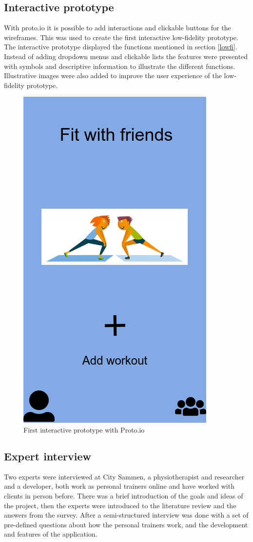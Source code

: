 \subsection{Interactive prototype}
With proto.io it is possible to add interactions and clickable buttons for the wireframes. This was used to create the first interactive low-fidelity prototype. The interactive prototype displayed the functions mentioned in section \ref{lowfi}. Instead of adding dropdown menus and clickable lists the features were presented with symbols and descriptive information to illustrate the different functions. Illustrative images were also added to improve the user experience of the low-fidelity prototype.
\begin{figure}[H]
    \centering
    \includegraphics[scale=0.25]{figures/777.png}
    \caption{First interactive prototype with Proto.io}
    \label{intProt}
\end{figure}
\subsection{Expert interview} \label{expertinterview}
Two experts were interviewed at City Sammen, a physiotherapist and researcher and a developer, both work as personal trainers online and have worked with clients in person before. There was a brief introduction of the goals and ideas of the project, then the experts were introduced to the literature review and the answers from the survey. After a semi-structured interview was done with a set of pre-defined questions about how the personal trainers work, and the development and features of the application. 

